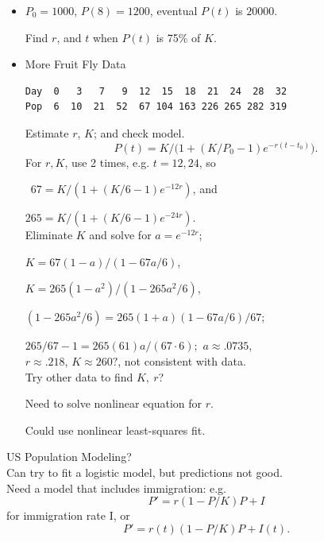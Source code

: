 \documentclass[12pt]{article}\usepackage[]{graphicx}\usepackage[]{color}
\newcommand{\zsp}{\rule{0pt}{5pt}}
\newcommand{\ind}{\zsp\hspace{6mm}}
\begin{document}
\begin{itemize}
\item $P_0 = 1000$, $P(8)=1200$, eventual $P(t)$ is $20000$.\\\ind
Find $r$, and $t$ when $P(t)$ is 75\% of $K$.\vspace{3.75in}


\newpage
\item More Fruit Fly Data\vspace{-3mm}
\begin{verbatim}
Day  0   3   7   9  12  15  18  21  24  28  32 
Pop  6  10  21  52  67 104 163 226 265 282 319
\end{verbatim}
Estimate $r$, $K$; and check model.
$$P(t) = K/\big(1+(K/P_0-1)e^{-r(t-t_0)}\big).$$
For $r, K$, use 2 times, e.g. $t = 12, 24$, so\\\ind
\ $67 = K/(1+(K/6-1)e^{-12r})$, and\\\ind
$265 = K/(1+(K/6-1)e^{-24r})$.\\
Eliminate $K$ and solve for $a=e^{-12r}$;

\vspace{1in}

\ind
$K = 67(1-a)/(1-67a/6)$,\\\ind $K = 265(1-a^2)/(1-265a^2/6)$,\\\ind 
$(1-265a^2/6) = 265(1+a)(1-67a/6)/67$;\\\ind
$265/67-1 = 265(61)a/(67\cdot 6);$ $a \approx .0735$, \\$r\approx .218$, 
$K\approx 260?$, not consistent with data.\\

Try other data to find $K,\ r$? \\\ind 
Need to solve nonlinear equation for $r$.\\\ind
Could use nonlinear least-squares fit.
\end{itemize}

US Population Modeling?\\
Can try to fit a logistic model, but predictions not good.\\
Need a model that includes immigration: e.g.
$$P' = r(1-P/K)P + I$$ 
for immigration rate I, or
$$P' = r(t)(1-P/K)P + I(t).$$ 
\end{document}
